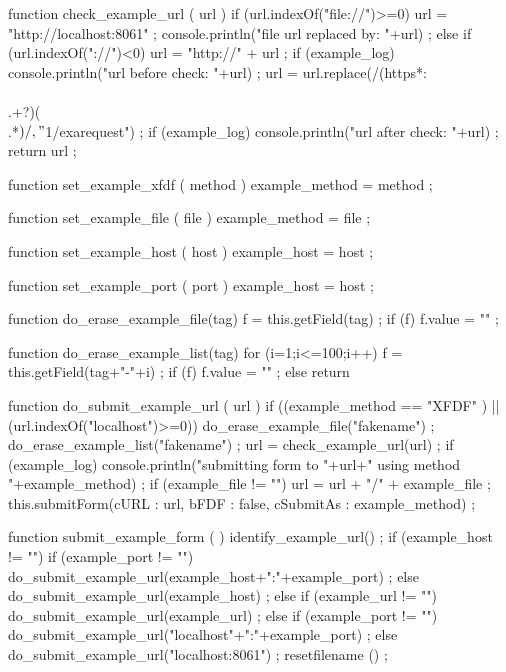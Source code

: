     function check_example_url ( url ) {
        if (url.indexOf("file://")>=0) {
            url = "http://localhost:8061" ;
            console.println("file url replaced by: "+url) ;
        } else {
            if (url.indexOf("://")<0) {
                url = "http://" + url ;
            }
            if (example_log) {
                console.println("url before check: "+url) ;
            }
            url = url.replace(/(https*:\\\/\\\/.+?)(\\\/.*$)/, "$1/exarequest") ;
            if (example_log) {
                console.println("url after check: "+url) ;
            }
        }
        return url ;
    }

    function set_example_xfdf ( method ) {
        example_method = method ;
    }

    function set_example_file ( file ) {
        example_method = file ;
    }

    function set_example_host ( host ) {
        example_host = host ;
    }

    function set_example_port ( port ) {
        example_host = host ;
    }

    function do_erase_example_file(tag) {
        f = this.getField(tag) ;
        if (f) {
            f.value = "" ;
        }
    }

    function do_erase_example_list(tag) {
        for (i=1;i<=100;i++) {
            f = this.getField(tag+"-"+i) ;
            if (f) {
                f.value = "" ;
            } else {
                return
            }
        }
    }

    function do_submit_example_url ( url ) {
        if ((example_method == "XFDF" ) || (url.indexOf("localhost")>=0)) {
            do_erase_example_file("fakename") ;
            do_erase_example_list("fakename") ;
        }
        url = check_example_url(url) ;
        if (example_log) {
            console.println("submitting form to "+url+" using method "+example_method) ;
        }
        if (example_file != "") {
            url = url + "/" + example_file ;
        }
        this.submitForm({cURL : url, bFDF : false, cSubmitAs : example_method}) ;
    }

    function submit_example_form ( ) {
        identify_example_url() ;
        if (example_host != "") {
            if (example_port != "") {
                do_submit_example_url(example_host+":"+example_port) ;
            } else {
                do_submit_example_url(example_host) ;
            }
        } else {
            if (example_url != "") {
                do_submit_example_url(example_url) ;
            } else {
                if (example_port != "") {
                    do_submit_example_url("localhost"+":"+example_port) ;
                } else {
                    do_submit_example_url("localhost:8061") ; %
                }
            }
        }
        resetfilename () ;
    }

